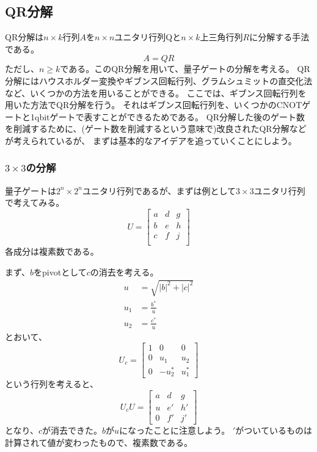 \subsection{QR分解}
QR分解は$n\times k$行列$A$を$n\times n$ユニタリ行列Qと$n\times k$上三角行列$R$に分解する手法である\cite{golub2012matrix}。
\begin{equation}
  A = QR
\end{equation}
ただし、$n\geq k$である。このQR分解を用いて、量子ゲートの分解を考える。
QR分解にはハウスホルダー変換やギブンス回転行列、グラムシュミットの直交化法など、いくつかの方法を用いることができる。
ここでは、ギブンス回転行列を用いた方法でQR分解を行う。
それはギブンス回転行列を、いくつかのCNOTゲートと1qbitゲートで表すことができるためである。
QR分解した後のゲート数を削減するために、(ゲート数を削減するという意味で)改良されたQR分解などが考えられているが、
まずは基本的なアイデアを追っていくことにしよう。

\subsubsection{$3\times 3$の分解}
量子ゲートは$2^n\times 2^n$ユニタリ行列であるが、まずは例として$3\times 3$ユニタリ行列で考えてみる。
\begin{equation}
  U =
    \begin{bmatrix}
      a & d & g \\
      b & e & h \\
      c & f & j \\
    \end{bmatrix}
\end{equation}
各成分は複素数である。

まず、$b$をpivotとして$c$の消去を考える。
\begin{align}
  u   &= \sqrt{|b|^2 + |c|^2} \\
  u_1 &= \frac{b^*}{u}\\
  u_2 &= \frac{c^*}{u}
\end{align}
とおいて、
\begin{equation}
  U_c =
  \begin{bmatrix}
    1 & 0      & 0   \\
    0 & u_1    & u_2 \\
    0 & -u_2^* & u_1^*
  \end{bmatrix}
\end{equation}
という行列を考えると、
\begin{equation}
  U_c U =
  \begin{bmatrix}
    a & d & g \\
    u & e' & h' \\
    0 & f' & j'
  \end{bmatrix}
\end{equation}
となり、$c$が消去できた。$b$が$u$になったことに注意しよう。
$'$がついているものは計算されて値が変わったもので、複素数である。

